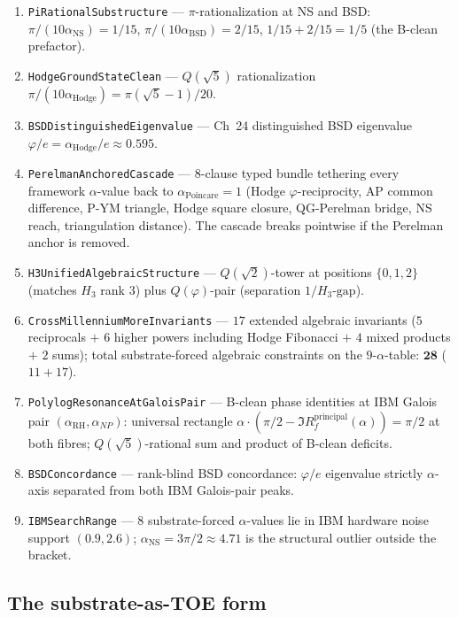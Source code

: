 \documentclass[11pt,a4paper]{article}
\theoremstyle{plain}
\theoremstyle{definition}
\theoremstyle{remark}
\newcommand{\aPo}{\alpha_{\mathrm{Poincare}}}
\newcommand{\aNP}{\alpha_{NP}}
\newcommand{\aRH}{\alpha_{\mathrm{RH}}}
\newcommand{\aNS}{\alpha_{\mathrm{NS}}}
\newcommand{\aBSD}{\alpha_{\mathrm{BSD}}}
\newcommand{\aHodge}{\alpha_{\mathrm{Hodge}}}
\newcommand{\code}[1]{\texttt{#1}}
\begin{document}
\begin{enumerate}[label=\textbf{S\arabic*}]
\item \code{PiRationalSubstructure} ---
$\pi$-rationalization at NS and BSD:
$\pi/(10 \aNS) = 1/15$, $\pi/(10 \aBSD) = 2/15$,
$1/15 + 2/15 = 1/5$ (the B-clean prefactor).

\item \code{HodgeGroundStateClean} ---
$Q(\sqrt{5})$ rationalization
$\pi/(10 \aHodge) = \pi(\sqrt{5}-1)/20$.

\item \code{BSDDistinguishedEigenvalue} --- Ch~24 distinguished
BSD eigenvalue $\varphi/e = \aHodge/e \approx 0.595$.

\item \code{PerelmanAnchoredCascade} --- $8$-clause typed
bundle tethering every framework $\alpha$-value back to
$\aPo = 1$ (Hodge $\varphi$-reciprocity, AP common difference,
P-YM triangle, Hodge square closure, QG-Perelman bridge, NS
reach, triangulation distance). The cascade breaks pointwise
if the Perelman anchor is removed.

\item \code{H3UnifiedAlgebraicStructure} ---
$Q(\sqrt{2})$-tower at positions $\{0, 1, 2\}$ (matches $H_{3}$
rank $3$) plus $Q(\varphi)$-pair (separation $1/H_{3}\text{-gap}$).

\item \code{CrossMillenniumMoreInvariants} --- $17$ extended
algebraic invariants ($5$ reciprocals $+$ $6$ higher powers
including Hodge Fibonacci $+$ $4$ mixed products $+$ $2$ sums);
total substrate-forced algebraic constraints on the $9$-$\alpha$-table:
$\boldsymbol{28}$ ($11 + 17$).

\item \code{PolylogResonanceAtGaloisPair} --- B-clean phase
identities at IBM Galois pair $(\aRH, \aNP)$: universal
rectangle $\alpha \cdot (\pi/2 - \Im R_{f}^{\mathrm{principal}}(\alpha)) = \pi/2$
at both fibres; $Q(\sqrt{5})$-rational sum and product of
B-clean deficits.

\item \code{BSDConcordance} --- rank-blind BSD concordance:
$\varphi/e$ eigenvalue strictly $\alpha$-axis separated from
both IBM Galois-pair peaks.

\item \code{IBMSearchRange} --- $8$ substrate-forced
$\alpha$-values lie in IBM hardware noise support $(0.9, 2.6)$;
$\aNS = 3\pi/2 \approx 4.71$ is the structural outlier outside
the bracket.
\end{enumerate}

\subsection*{The substrate-as-TOE form}
\end{document}
